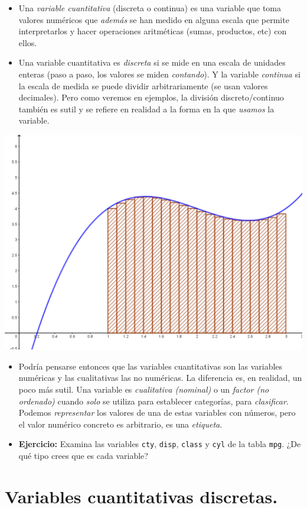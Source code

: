 \documentclass[
  9pt,
  ignorenonframetext,
]{beamer}
\begin{document}
\begin{frame}[fragile]

\begin{itemize}
\item
  Una \emph{variable cuantitativa} (discreta o continua) es una variable
  que toma valores numéricos que \emph{además} se han medido en alguna
  escala que permite interpretarlos y hacer operaciones aritméticas
  (sumas, productos, etc) con ellos.
\item
  Una variable cuantitativa es \emph{discreta} si se mide en una escala
  de unidades enteras (paso a paso, los valores se miden
  \emph{contando}). Y la variable \emph{continua} si la escala de medida
  se puede dividir arbitrariamente (se usan valores decimales). Pero
  como veremos en ejemplos, la división discreto/continuo también es
  sutil y se refiere en realidad a la forma en la que \emph{usamos} la
  variable.
\end{itemize}

\begin{center}\includegraphics[width=0.2\linewidth]{../fig/02-fig03-DiscretoContinuo} \end{center}

\begin{itemize}
\item
  Podría pensarse entonces que las variables cuantitativas son las
  variables numéricas y las cualitativas las no numéricas. La diferencia
  es, en realidad, un poco más sutil. Una variable es \emph{cualitativa
  (nominal)} o un \emph{factor (no ordenado)} cuando \emph{solo} se
  utiliza para establecer categorías, para \emph{clasificar}. Podemos
  \emph{representar} los valores de una de estas variables con números,
  pero el valor numérico concreto es arbitrario, es una \emph{etiqueta}.
\item
  \textbf{Ejercicio:} Examina las variables \texttt{cty}, \texttt{disp},
  \texttt{class} y \texttt{cyl} de la tabla \texttt{mpg}. ¿De qué tipo
  crees que es cada variable?
\end{itemize}

\end{frame}

\hypertarget{variables-cuantitativas-discretas.}{%
\section{Variables cuantitativas
discretas.}\label{variables-cuantitativas-discretas.}}
\end{document}
